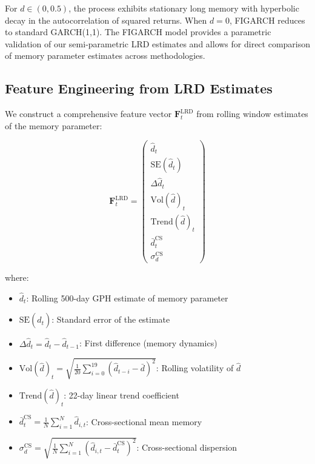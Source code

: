 \documentclass[12pt,a4paper]{article}
\begin{document}
For $d \in (0, 0.5)$, the process exhibits stationary long memory with hyperbolic decay in the autocorrelation of squared returns. When $d = 0$, FIGARCH reduces to standard GARCH(1,1). The FIGARCH model provides a parametric validation of our semi-parametric LRD estimates and allows for direct comparison of memory parameter estimates across methodologies.

\subsection{Feature Engineering from LRD Estimates}

We construct a comprehensive feature vector $\mathbf{F}_t^{\text{LRD}}$ from rolling window estimates of the memory parameter:

\begin{equation}
    \mathbf{F}_t^{\text{LRD}} = \begin{pmatrix}
        \hat{d}_t \\
        \text{SE}(\hat{d}_t) \\
        \Delta\hat{d}_t \\
        \text{Vol}(\hat{d})_t \\
        \text{Trend}(\hat{d})_t \\
        \bar{d}_t^{\text{CS}} \\
        \sigma_d^{\text{CS}}
    \end{pmatrix}
\end{equation}

where:
\begin{itemize}
    \item $\hat{d}_t$: Rolling 500-day GPH estimate of memory parameter
    \item $\text{SE}(\hat{d}_t)$: Standard error of the estimate
    \item $\Delta\hat{d}_t = \hat{d}_t - \hat{d}_{t-1}$: First difference (memory dynamics)
    \item $\text{Vol}(\hat{d})_t = \sqrt{\frac{1}{20}\sum_{i=0}^{19}(\hat{d}_{t-i} - \bar{d})^2}$: Rolling volatility of $\hat{d}$
    \item $\text{Trend}(\hat{d})_t$: 22-day linear trend coefficient
    \item $\bar{d}_t^{\text{CS}} = \frac{1}{N}\sum_{i=1}^N \hat{d}_{i,t}$: Cross-sectional mean memory
    \item $\sigma_d^{\text{CS}} = \sqrt{\frac{1}{N}\sum_{i=1}^N (\hat{d}_{i,t} - \bar{d}_t^{\text{CS}})^2}$: Cross-sectional dispersion
\end{itemize}
\end{document}
